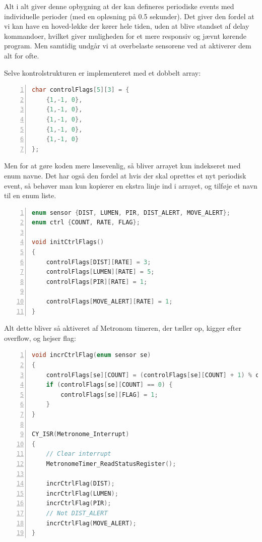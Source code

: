 Alt i alt giver denne opbygning at der kan defineres periodiske events med individuelle perioder (med en opløsning på 0.5 sekunder). Det giver den fordel at vi kan have en hoved-løkke der kører hele tiden, uden at blive standset af delay kommandoer, hvilket giver muligheden for et mere responsiv og jævnt kørende program. Men samtidig undgår vi at overbelaste sensorene ved at aktiverer dem alt for ofte.

Selve kontrolstrukturen er implementeret med et dobbelt array:

\begin{lstlisting}[frame=single, basicstyle=\footnotesize\ttfamily, language=C, numbers=left, numberstyle=\tiny\color{black}, caption={Kodeudsnit: controlFlags},captionpos=b]
char controlFlags[5][3] = {
    {1,-1, 0},
    {1,-1, 0},
    {1,-1, 0},
    {1,-1, 0},
    {1,-1, 0}
};
\end{lstlisting}

Men for at gøre koden mere læsevenlig, så bliver arrayet kun indekseret med enum navne. Det har også den fordel at hvis der skal oprettes et nyt periodisk event, så behøver man kun kopierer en ekstra linje ind i arrayet, og tilføje et navn til en enum liste.

\begin{lstlisting}[frame=single, basicstyle=\footnotesize\ttfamily, language=C, numbers=left, numberstyle=\tiny\color{black}, caption={Kodeudsnit: enums og indeksering},captionpos=b]
enum sensor {DIST, LUMEN, PIR, DIST_ALERT, MOVE_ALERT};
enum ctrl {COUNT, RATE, FLAG};

void initCtrlFlags()
{
    controlFlags[DIST][RATE] = 3;
    controlFlags[LUMEN][RATE] = 5;
    controlFlags[PIR][RATE] = 1;

    controlFlags[MOVE_ALERT][RATE] = 1;
}
\end{lstlisting}

Alt dette bliver så aktiveret af Metronom timeren, der tæller op, kigger efter overflow, og hejser flag:

\begin{lstlisting}[frame=single, basicstyle=\footnotesize\ttfamily, language=C, numbers=left, numberstyle=\tiny\color{black}, caption={Kodeudsnit: Metronom interrupt og hjælpefunktion},captionpos=b]
void incrCtrlFlag(enum sensor se)
{
    controlFlags[se][COUNT] = (controlFlags[se][COUNT] + 1) % controlFlags[se][RATE];
    if (controlFlags[se][COUNT] == 0) {
        controlFlags[se][FLAG] = 1;
    }
}

CY_ISR(Metronome_Interrupt)
{
    // Clear interrupt
    MetronomeTimer_ReadStatusRegister();

    incrCtrlFlag(DIST);
    incrCtrlFlag(LUMEN);
    incrCtrlFlag(PIR);
    // Not DIST_ALERT
    incrCtrlFlag(MOVE_ALERT);
}
\end{lstlisting}

